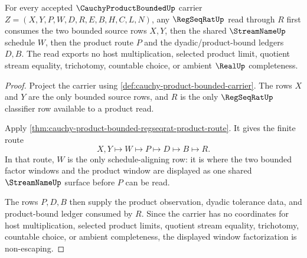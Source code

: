 \begin{theorem}
\label{thm:cauchy-product-bounded-regseqrat-window-factorization}
For every accepted $\CauchyProductBoundedUp$ carrier $Z=(X,Y,P,W,D,R,E,B,H,C,L,N)$, any $\RegSeqRatUp$ read through $R$ first consumes the two bounded source rows $X,Y$, then the shared $\StreamNameUp$ schedule $W$, then the product route $P$ and the dyadic/product-bound ledgers $D,B$. The read exports no host multiplication, selected product limit, quotient stream equality, trichotomy, countable choice, or ambient $\RealUp$ completeness.
\end{theorem}
\begin{proof}
Project the carrier using \autoref{def:cauchy-product-bounded-carrier}. The rows $X$ and $Y$ are the only bounded source rows, and $R$ is the only $\RegSeqRatUp$ classifier row available to a product read.

Apply \autoref{thm:cauchy-product-bounded-regseqrat-product-route}. It gives the finite route
$$
X,Y\longmapsto W\longmapsto P\longmapsto D\longmapsto B\longmapsto R .
$$
In that route, $W$ is the only schedule-aligning row: it is where the two bounded factor windows and the product window are displayed as one shared $\StreamNameUp$ surface before $P$ can be read.

The rows $P,D,B$ then supply the product observation, dyadic tolerance data, and product-bound ledger consumed by $R$. Since the carrier has no coordinates for host multiplication, selected product limits, quotient stream equality, trichotomy, countable choice, or ambient completeness, the displayed window factorization is non-escaping.
\end{proof}

